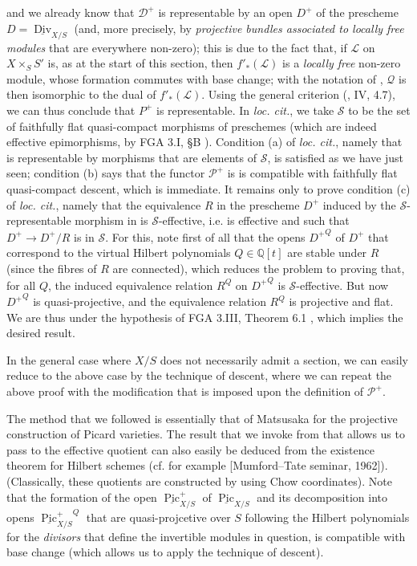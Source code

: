 and we already know that $\mathcal{D}^+$ is representable by an open $D^+$ of the prescheme $D=\underline{\operatorname{Div}}_{X/S}$ (and, more precisely, by \emph{projective bundles associated to locally free modules} that are everywhere non-zero);
this is due to the fact that, if $\mathcal{L}$ on $X\times_S S'$ is, as at the start of this section, then $f'_*(\mathcal{L})$ is a \emph{locally free} non-zero module, whose formation commutes with base change;
with the notation of , $\mathcal{Q}$ is then isomorphic to the dual of $f'_*(\mathcal{L})$.
Using the general criterion (\cite{Gro1960a}, IV, 4.7), we can thus conclude that $P^+$ is representable.
In \emph{loc. cit.}, we take $\mathcal{S}$ to be the set of faithfully flat quasi-compact morphisms of preschemes (which are indeed effective epimorphisms, by FGA 3.I, §B ).
Condition (a) of \emph{loc. cit.}, namely that  is representable by morphisms that are elements of $\mathcal{S}$, is satisfied as we have just seen;
condition (b) says that the functor $\mathcal{P}^+$ is is compatible with faithfully flat quasi-compact descent, which is immediate.
It remains only to prove condition (c) of \emph{loc. cit.}, namely that the equivalence $R$ in the prescheme $D^+$ induced by the $\mathcal{S}$-representable morphism in  is $\mathcal{S}$-effective, i.e. is effective and such that $D^+\to D^+/R$ is in $\mathcal{S}$.
For this, note first of all that the opens ${D^+}^Q$ of $D^+$ that correspond to the virtual Hilbert polynomials $Q\in\mathbb{Q}[t]$ are stable under $R$ (since the fibres of $R$ are connected), which reduces the problem to proving that, for all $Q$, the induced equivalence relation $R^Q$ on ${D^+}^Q$ is $\mathcal{S}$-effective.
But now ${D^+}^Q$ is quasi-projective, and the equivalence relation $R^Q$ is projective and flat.
We are thus under the hypothesis of FGA 3.III, Theorem 6.1 , which implies the desired result.

In the general case where $X/S$ does not necessarily admit a section, we can easily reduce to the above case by the technique of descent, where we can repeat the above proof with the modification that is imposed upon the definition of $\mathcal{P}^+$.

\begin{remark}\label{fga3.v-5-remarks-5.1}
    The method that we followed is essentially that of Matsusaka for the projective construction of Picard varieties.
    The result that we invoke from  that allows us to pass to the effective quotient can also easily be deduced from the existence theorem for Hilbert schemes (cf. for example [Mumford–Tate seminar, 1962]).
    (Classically, these quotients are constructed by using Chow coordinates).
    Note that the formation of the open $\underline{\operatorname{Pic}}_{X/S}^+$ of $\underline{\operatorname{Pic}}_{X/S}$ and its decomposition into opens ${\underline{\operatorname{Pic}}_{X/S}^+}^Q$ that are quasi-projcetive over $S$ following the Hilbert polynomials for the \emph{divisors} that define the invertible modules in question, is compatible with base change (which allows us to apply the technique of descent).
\end{remark}

